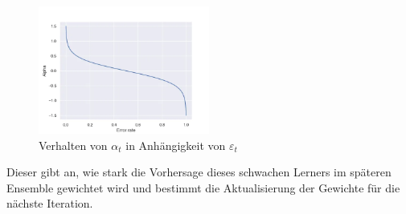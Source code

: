 
\begin{figure}
    \centering
    \includegraphics[width=0.5\textwidth]{figures/alpha_graph.png}
    \caption{Verhalten von $\alpha_t$ in Anhängigkeit von $\varepsilon_t$}
\end{figure}
Dieser gibt an, wie stark die Vorhersage dieses schwachen Lerners im späteren Ensemble
gewichtet wird und bestimmt die Aktualisierung der Gewichte für die nächste Iteration.